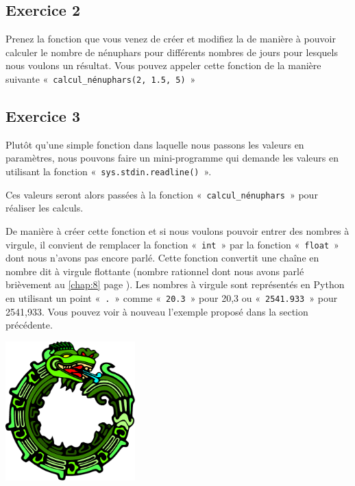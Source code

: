 \subsection{Exercice 2}
Prenez la fonction que vous venez de créer et modifiez la de manière à pouvoir calculer le nombre de nénuphars pour différents nombres de jours pour lesquels nous voulons un résultat.
Vous pouvez appeler cette fonction de la manière suivante «~\texttt{calcul\_nénuphars(2, 1.5, 5)}~» 

\subsection{Exercice 3}
Plutôt qu'une simple fonction dans laquelle nous passons les valeurs en paramètres, nous pouvons faire un mini-programme qui demande les valeurs en utilisant la fonction «~\texttt{sys.stdin.readline()}~».

Ces valeurs seront alors passées à la fonction «~\texttt{calcul\_nénuphars}~» pour réaliser les calculs.

De manière à créer cette fonction et si nous voulons pouvoir entrer des nombres à virgule, il convient de remplacer la fonction «~\texttt{int}~» par la fonction «~\texttt{float}~» dont nous n'avons pas encore parlé.
Cette fonction convertit une chaîne en nombre dit à virgule flottante (nombre rationnel dont nous avons parlé brièvement au \autoref{chap:8} page \pageref{chap:8}). Les nombres à virgule sont représentés en Python en utilisant un point «~\texttt{.}~» comme «~\texttt{20.3}~» pour 20,3 ou «~\texttt{2541.933}~»  pour 2541,933. Vous pouvez voir à nouveau l'exemple  proposé dans la section précédente.

 \vfill
\begin{center}
 \includegraphics[width=5cm]{images/ourochin.pdf}
\end{center}
 \vfill
 